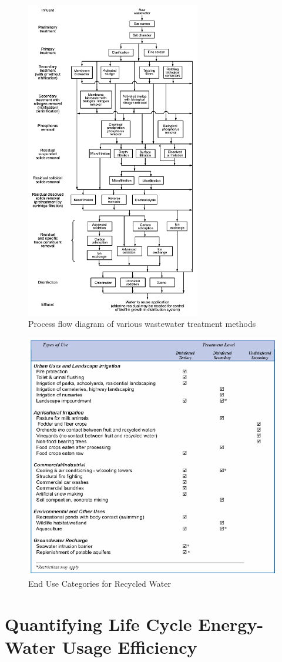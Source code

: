      \begin{figure}[Process flow diagram of various wastewater treatment methods]
       \centering
       \includegraphics[width=3in]{figures/process-flow.png}
       \caption[Process Flow Diagram of Wastewater Treatment Methods]{Process flow diagram of various wastewater treatment methods}
       \label{fig:process-flow-diagram}
     \end{figure}
    
     \begin{figure}[End Use Categories for Recycled Water]
       \centering
       \includegraphics[width=5.5in]{figures/use-categories.png}
       \caption[End Use Categories for Recycled Water]{End Use Categories for Recycled Water}
       \label{fig:use-categories}
     \end{figure}        
              
 \section{Quantifying Life Cycle Energy-Water Usage Efficiency}

